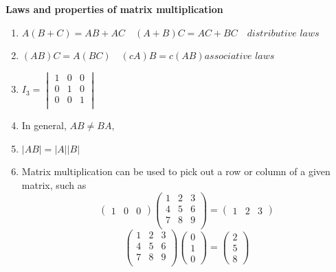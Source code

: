 \documentclass{article}
\newcommand\deter[1]{\left| #1 \right|}
\begin{document}
\textbf{Laws and properties of matrix multiplication}
\begin{enumerate}
  \item $A(B+C) = AB + AC \quad (A + B)C = AC + BC \quad \textit{distributive laws}$
  \item $(AB)C = A(BC) \quad (cA)B = c(AB)  \textit{associative laws}$
  \item $I_3 =  \begin{vmatrix}
            1 & 0 & 0 \\
            0 & 1 & 0 \\
            0 & 0 & 1 \\
          \end{vmatrix}$
  \item In general, $AB \neq BA$,
  \item $\deter{AB} = \deter{A}\deter{B}$
  \item Matrix multiplication can be used to pick out a row or column of a given matrix, such as
        $$
          \begin{pmatrix}
            1 & 0 & 0
          \end{pmatrix}
          \begin{pmatrix}
            1 & 2 & 3 \\
            4 & 5 & 6 \\
            7 & 8 & 9 \\
          \end{pmatrix}
          =
          \begin{pmatrix}
            1 & 2 & 3
          \end{pmatrix}
        $$
        $$
          \begin{pmatrix}
            1 & 2 & 3 \\
            4 & 5 & 6 \\
            7 & 8 & 9 \\
          \end{pmatrix}
          \begin{pmatrix}
            0 \\
            1 \\
            0
          \end{pmatrix}
          =
          \begin{pmatrix}
            2 \\
            5 \\
            8
          \end{pmatrix}
        $$
\end{enumerate}
\end{document}
